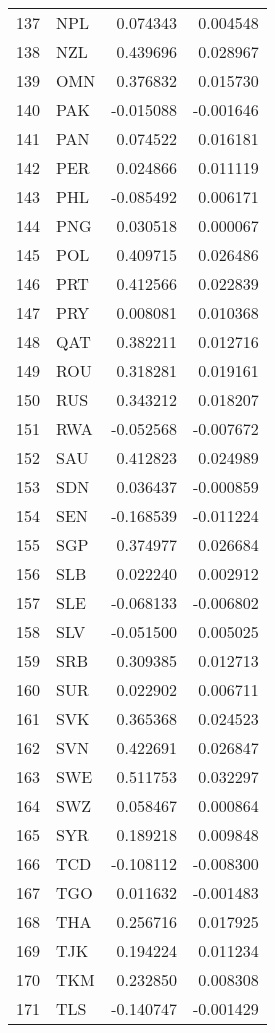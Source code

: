 \begin{tabular}{llrr}
137 & NPL & 0.074343 & 0.004548 \\
138 & NZL & 0.439696 & 0.028967 \\
139 & OMN & 0.376832 & 0.015730 \\
140 & PAK & -0.015088 & -0.001646 \\
141 & PAN & 0.074522 & 0.016181 \\
142 & PER & 0.024866 & 0.011119 \\
143 & PHL & -0.085492 & 0.006171 \\
144 & PNG & 0.030518 & 0.000067 \\
145 & POL & 0.409715 & 0.026486 \\
146 & PRT & 0.412566 & 0.022839 \\
147 & PRY & 0.008081 & 0.010368 \\
148 & QAT & 0.382211 & 0.012716 \\
149 & ROU & 0.318281 & 0.019161 \\
150 & RUS & 0.343212 & 0.018207 \\
151 & RWA & -0.052568 & -0.007672 \\
152 & SAU & 0.412823 & 0.024989 \\
153 & SDN & 0.036437 & -0.000859 \\
154 & SEN & -0.168539 & -0.011224 \\
155 & SGP & 0.374977 & 0.026684 \\
156 & SLB & 0.022240 & 0.002912 \\
157 & SLE & -0.068133 & -0.006802 \\
158 & SLV & -0.051500 & 0.005025 \\
159 & SRB & 0.309385 & 0.012713 \\
160 & SUR & 0.022902 & 0.006711 \\
161 & SVK & 0.365368 & 0.024523 \\
162 & SVN & 0.422691 & 0.026847 \\
163 & SWE & 0.511753 & 0.032297 \\
164 & SWZ & 0.058467 & 0.000864 \\
165 & SYR & 0.189218 & 0.009848 \\
166 & TCD & -0.108112 & -0.008300 \\
167 & TGO & 0.011632 & -0.001483 \\
168 & THA & 0.256716 & 0.017925 \\
169 & TJK & 0.194224 & 0.011234 \\
170 & TKM & 0.232850 & 0.008308 \\
171 & TLS & -0.140747 & -0.001429 \\

\end{tabular}
